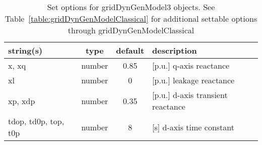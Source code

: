 \begin{table}[ht]
\centering
\begin{tabular}{p{5cm} c c p{7cm}}
\hline
string(s) & type & default & description \\
\hline
x, xq & number & 0.85 & [p.u.] q-axis reactance\\
xl & number & 0 & [p.u.] leakage reactance\\
xp, xdp & number & 0.35 & [p.u.] d-axis transient reactance\\
tdop, td0p, top, t0p & number & 8 & [s]    d-axis time constant\\
\hline
\end{tabular}
\caption{Set options for gridDynGenModel3 objects. See Table~\ref{table:gridDynGenModelClassical} for additional settable options through gridDynGenModelClassical}
\label{table:gridDynGenModel3}
\end{table}

